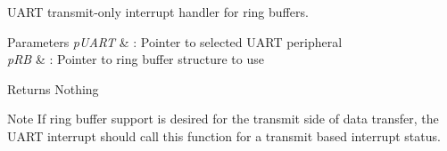 U\-A\-R\-T transmit-\/only interrupt handler for ring buffers. 


\begin{DoxyParams}{Parameters}
{\em p\-U\-A\-R\-T} & \-: Pointer to selected U\-A\-R\-T peripheral \\
\hline
{\em p\-R\-B} & \-: Pointer to ring buffer structure to use \\
\hline
\end{DoxyParams}
\begin{DoxyReturn}{Returns}
Nothing 
\end{DoxyReturn}
\begin{DoxyNote}{Note}
If ring buffer support is desired for the transmit side of data transfer, the U\-A\-R\-T interrupt should call this function for a transmit based interrupt status. 
\end{DoxyNote}
